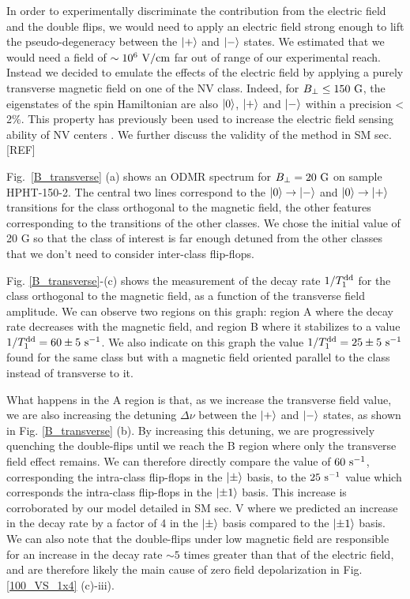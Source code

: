 \documentclass[preprintnumbers,amsmath,amssymb,superscriptaddress,twocolumn,showpacs]{revtex4-2}
\begin{document}
In order to experimentally discriminate the contribution from the electric field and the double flips, we would need to apply an electric field strong enough to lift the pseudo-degeneracy between the $\ket{+}$ and $\ket{-}$ states. We estimated that we would need a field of $\sim 10^6\ \rm{V/cm}$ far out of range of our experimental reach. Instead we decided to emulate the effects of the electric field by applying a purely transverse magnetic field on one of the NV class. Indeed, for $B_{\perp} \leq 150\ \rm G$, the eigenstates of the spin Hamiltonian are also $\ket{0}$, $\ket{+}$ and $\ket{-}$ within a precision < 2\%. This property has previously been used to increase the electric field sensing ability of NV centers \cite{dolde2011electric,qiu2022nanoscale}. We further discuss the validity of the method in SM sec. [REF]

Fig.~\ref{B_transverse} (a) shows an ODMR spectrum for $B_{\perp}=20\ \rm G$ on sample HPHT-150-2. The central two lines correspond to the $\ket{0}\to \ket{-}$ and $\ket{0}\to \ket{+}$ transitions for the class orthogonal to the magnetic field, the other features corresponding to the transitions of the other classes. We chose the initial value of 20 G so that the class of interest is far enough detuned from the other classes that we don't need to consider inter-class flip-flops. 

Fig. \ref{B_transverse}-(c) shows the measurement of the decay rate $1/T_1^{\rm dd}$ for the class orthogonal to the magnetic field, as a function of the transverse field amplitude. We can observe two regions on this graph: region A where the decay rate decreases with the magnetic field, and region B where it stabilizes to a value $1/T_1^{\rm dd}=60\pm 5\ \rm{s}^{-1}$. We also indicate on this graph the value $1/T_1^{\rm dd}=25\pm 5\ \rm{s}^{-1}$ found for the same class but with a magnetic field oriented parallel to the class instead of transverse to it.

What happens in the A region is that, as we increase the transverse field value, we are also increasing the detuning $\Delta \nu$ between the $\ket{+}$ and $\ket{-}$ states, as shown in Fig. \ref{B_transverse} (b). By increasing this detuning, we are progressively quenching the double-flips until we reach the B region where only the transverse field effect remains. We can therefore directly compare the value of $60\ \rm{s}^{-1}$, corresponding the intra-class flip-flops in the $\ket{\pm}$ basis, to the $25\ \rm{s}^{-1}$ value which corresponds the intra-class flip-flops in the $\ket{\pm 1}$ basis. This increase is corroborated by our model detailed in SM sec. V where we predicted an increase in the decay rate by a factor of 4 in the $\ket{\pm}$ basis compared to the $\ket{\pm 1}$ basis. We can also note that the double-flips under low magnetic field are responsible for an increase in the decay rate $\sim 5$ times greater than that of the electric field, and are therefore likely the main cause of zero field depolarization in Fig. \ref{100_VS_1x4} (c)-iii).
\end{document}
